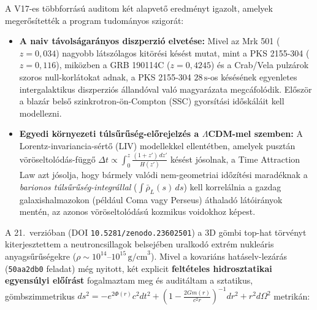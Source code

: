 \par
A V17-es t\"obbforr\'as\'u auditom k\'et alapvet\H{o} eredm\'enyt igazolt, amelyek meger\H{o}s\'itett\'ek a program tudom\'anyos szigor\'at:
\begin{itemize}\setlength{\itemsep}{1.5pt}\setlength{\parskip}{0pt}\setlength{\topsep}{1pt}
  \item \textbf{A naiv t\'avols\'agar\'anyos diszperzi\'o elvet\'ese:} Mivel az Mrk 501 ($z=0{,}034$) nagyobb l\'atsz\'olagos kit\"or\'esi k\'es\'est mutat, mint a PKS 2155-304 ($z=0{,}116$), mik\"ozben a GRB 190114C ($z=0{,}4245$) \'es a Crab/Vela pulz\'arok szoros null-korl\'atokat adnak, a PKS 2155-304 $28\,\text{s}$-os k\'es\'es\'enek egyenletes intergalaktikus diszperzi\'os \'alland\'oval val\'o magyar\'azata megc\'afol\'odik. El\H{o}sz\"or a blaz\'ar bels\H{o} szinkrotron-\"on-Compton (SSC) gyors\'it\'asi id\H{o}sk\'al\'ait kell modellezni.
  \item \textbf{Egyedi k\"ornyezeti t\'uls\H{u}r\H{u}s\'eg-el\H{o}rejelz\'es a $\Lambda$CDM-mel szemben:} A Lorentz-invariancia-s\'ert\H{o} (LIV) modellekkel ellent\'etben, amelyek puszt\'an v\"or\"oseltol\'od\'as-f\"ugg\H{o} $\Delta t \propto \int_0^z \frac{(1+z')\,dz'}{H(z')}$ k\'es\'est j\'osolnak, a Time Attraction Law azt j\'osolja, hogy b\'armely val\'odi nem-geometriai id\H{o}z\'it\'esi marad\'eknak a \emph{barionos t\'uls\H{u}r\H{u}s\'eg-integr\'allal} ($\int \bar{\rho}_L(s)\,ds$) kell korrel\'alnia a gazdag galaxishalmazokon (p\'eld\'aul Coma vagy Perseus) \'athalad\'o l\'at\'oir\'anyok ment\'en, az azonos v\"or\"oseltol\'od\'as\'u kozmikus voidokhoz k\'epest.
\end{itemize}
\newpage


A 21.\ verzi\'oban (DOI \texttt{10.5281/zenodo.23602501}) a 3D g\"ombi top-hat t\"orv\'enyt kiterjesztettem a neutroncsillagok belsej\'eben uralkod\'o extr\'em nukle\'aris anyags\H{u}r\H{u}s\'egekre ($\rho \sim 10^{14}\text{--}10^{15}\,\text{g/cm}^3$). Mivel a kovari\'ans hat\'aselv-lez\'ar\'as (\texttt{50aa2db0} feladat) m\'eg nyitott, k\'et explicit \textbf{felt\'eteles hidrosztatikai egyens\'ulyi el\H{o}\'ir\'ast} fogalmaztam meg \'es audit\'altam a sztatikus, g\"ombszimmetrikus $ds^2 = -e^{2\Phi(r)}c^2 dt^2 + (1 - \frac{2Gm(r)}{c^2 r})^{-1}dr^2 + r^2 d\Omega^2$ metrik\'an:

